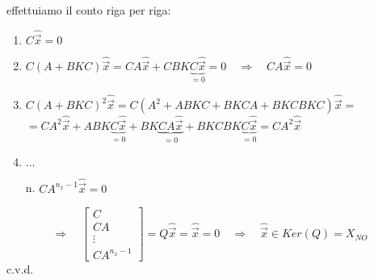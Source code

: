 \documentclass[../main.tex]{subfiles}
\begin{document}
		effettuiamo il conto riga per riga:
		\begin{enumerate}
			\item
				$ C \hat{\vec x} = 0 $
			\item
				$ C(A+BKC) \hat{\vec x} = CA \hat{\vec x} + CBK\underbrace{C \hat{\vec x}}_{=0} = 0 \quad\Rightarrow\quad CA \hat{\vec x} = 0 $
			\item 
				$ C(A+BKC)^2 \hat{\vec x} = C(A^2 + ABKC + BKCA + BKCBKC) \hat{\vec x} = $
				\\
				$ = CA^2 \hat{\vec x} + ABK \underbrace{C \hat{\vec x}}_{=0} + BK\underbrace{CA \hat{\vec x}}_{=0} + BKCBK\underbrace{C \hat{\vec x}}_{=0} = CA^2 \hat{\vec x} $
			\item $ \dots $
			\item[n.]
				$ C A^{n_x-1} \hat{\vec x} = 0 $
		\end{enumerate}
		\[
			\Rightarrow\quad
			\begin{bmatrix}
				C\\
				CA\\
				\vdots\\
				CA^{n_x-1}
			\end{bmatrix} 
			= Q \hat{\vec x} = \hat{\vec x} = 0
			\quad\Rightarrow\quad
			\hat{\vec x} \in Ker(Q) = X_{NO}
		\]
		c.v.d.
		
\end{document}
